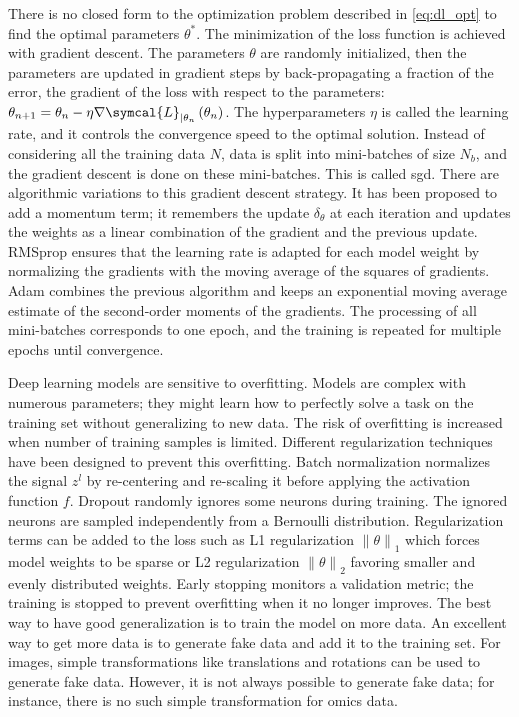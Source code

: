 \documentclass[../main.tex]{subfiles}
\begin{document}
	 There is no closed form to the optimization problem described in \cref{eq:dl_opt} to find the optimal parameters \(\theta^{*}\).
	 The minimization of the loss function is achieved with gradient descent.
	 The parameters \(\theta\) are randomly initialized, then the parameters are updated in gradient steps by back-propagating a fraction of the error, \ie{}the gradient of the loss with respect to the parameters: \(\theta_{n+1} = \theta_{n} - \eta \nabla \symcal{L}_{|\theta_n}\left(\theta_{n}\right)\).
	 The hyperparameters \(\eta\) is called the learning rate, and it controls the convergence speed to the optimal solution.
	 Instead of considering all the training data \(N\), data is split into mini-batches of size \(N_b\), and the gradient descent is done on these mini-batches.
	 This is called \gls{sgd}.
	 There are algorithmic variations to this gradient descent strategy.
	 It has been proposed to add a momentum term; it remembers the update \(\delta_{\theta}\) at each iteration and updates the weights as a linear combination of the gradient and the previous update.
	 RMSprop ensures that the learning rate is adapted for each model weight by normalizing the gradients with the moving average of the squares of gradients.
	 Adam combines the previous algorithm and keeps an exponential moving average estimate of the second-order moments of the gradients.
	 The processing of all mini-batches corresponds to one epoch, and the training is repeated for multiple epochs until convergence.


	 Deep learning models are sensitive to overfitting.
	 Models are complex with numerous parameters; they might learn how to perfectly solve a task on the training set without generalizing to new data.
	 The risk of overfitting is increased when number of training samples is limited.
	 Different regularization techniques have been designed to prevent this overfitting.
	 Batch normalization normalizes the signal \(z^{l}\) by re-centering and re-scaling it before applying the activation function \(f\).
	 Dropout randomly ignores some neurons during training.
	 The ignored neurons are sampled independently from a Bernoulli distribution.
	 Regularization terms can be added to the loss such as L1 regularization \({\|\theta\|}_{1}\) which forces model weights to be sparse or L2 regularization \({\|\theta\|}_{2}\) favoring smaller and evenly distributed weights.
	 Early stopping monitors a validation metric; the training is stopped to prevent overfitting when it no longer improves.
	 The best way to have good generalization is to train the model on more data.
	 An excellent way to get more data is to generate fake data and add it to the training set.
	 For images, simple transformations like translations and rotations can be used to generate fake data.
	 However, it is not always possible to generate fake data; for instance, there is no such simple transformation for omics data.
\end{document}
